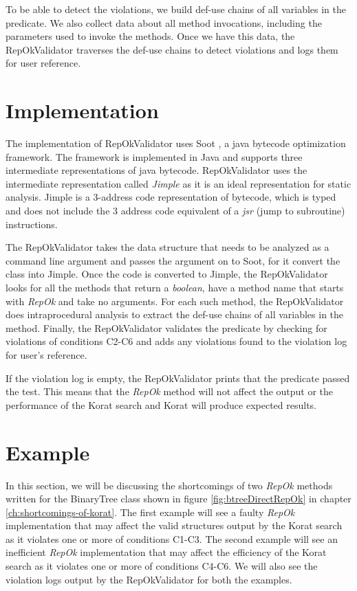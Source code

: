 \para To be able to detect the violations, we build def-use chains of
all variables in the predicate. We also collect data about all method
invocations, including the parameters used to invoke the methods. Once
we have this data, the RepOkValidator traverses the def-use chains to
detect violations and logs them for user reference.

\section{Implementation}
\label{sec:implementation}
The implementation of RepOkValidator uses Soot \cite{vallee1999soot}, a java
bytecode optimization framework. The framework is implemented in Java
and supports three intermediate representations of java
bytecode. RepOkValidator uses the intermediate representation called
\emph{Jimple} as it is an ideal representation for static analysis. Jimple is
a 3-address code representation of bytecode, which is typed and does
not include the 3 address code equivalent of a \emph{jsr} (jump to
subroutine) instructions.

\para The RepOkValidator takes the data structure that needs to be
analyzed as a command line argument and passes the argument on to
Soot, for it convert the class into Jimple. Once the code is converted
to Jimple, the RepOkValidator looks for all the methods that return a
\emph{boolean}, have a method name that starts with \emph{RepOk} and
take no arguments. For each such method, the RepOkValidator does
intraprocedural analysis to extract the def-use chains of all
variables in the method. Finally, the RepOkValidator validates the
predicate by checking for violations of conditions C2-C6 and adds any
violations found to the violation log for user’s reference.

\para If the violation log is empty, the RepOkValidator prints that
the predicate passed the test. This means that the \emph{RepOk} method
will not affect the output or the performance of the Korat search and
Korat will produce expected results.

\section{Example}
\label{sec:static-analysis-example}
In this section, we will be discussing the shortcomings of two
\emph{RepOk} methods written for the BinaryTree class shown in figure
\ref{fig:btreeDirectRepOk} in chapter
\ref{ch:shortcomings-of-korat}. The first example will see a faulty
\emph{RepOk} implementation that may affect the valid structures
output by the Korat search as it violates one or more of conditions
C1-C3. The second example will see an inefficient \emph{RepOk}
implementation that may affect the efficiency of the Korat search as
it violates one or more of conditions C4-C6. We will also see the
violation logs output by the RepOkValidator for both the examples.


